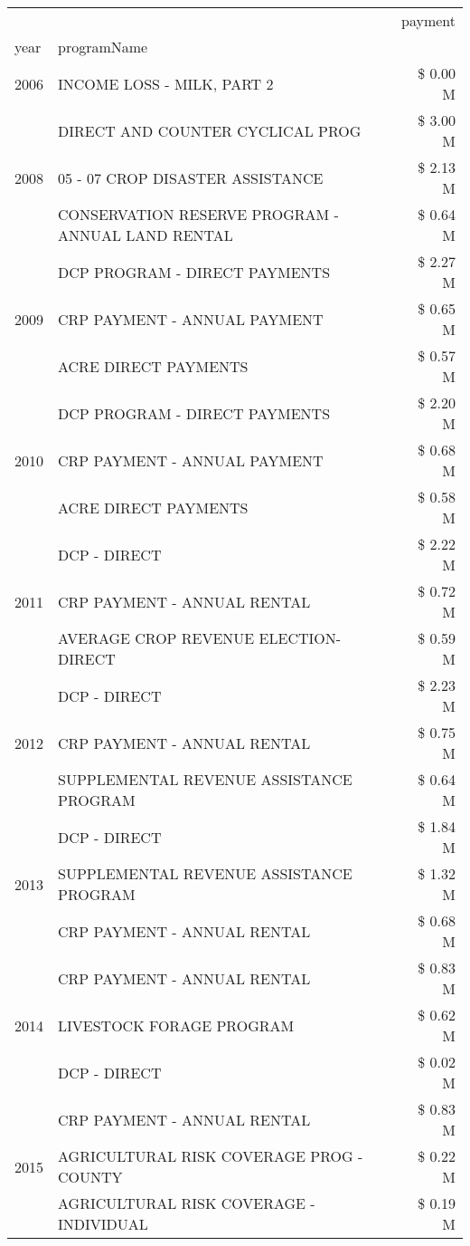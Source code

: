 \begin{tabular}{llr}
\toprule
 &  & payment \\
year & programName &  \\
\midrule
2006 & INCOME LOSS - MILK, PART 2 & \$ 0.00 M \\
\cline{1-3}
\multirow[t]{3}{*}{2008} & DIRECT AND COUNTER CYCLICAL PROG & \$ 3.00 M \\
 & 05 - 07 CROP DISASTER ASSISTANCE & \$ 2.13 M \\
 & CONSERVATION RESERVE PROGRAM - ANNUAL LAND RENTAL & \$ 0.64 M \\
\cline{1-3}
\multirow[t]{3}{*}{2009} & DCP PROGRAM - DIRECT PAYMENTS & \$ 2.27 M \\
 & CRP PAYMENT - ANNUAL PAYMENT & \$ 0.65 M \\
 & ACRE DIRECT PAYMENTS & \$ 0.57 M \\
\cline{1-3}
\multirow[t]{3}{*}{2010} & DCP PROGRAM - DIRECT PAYMENTS & \$ 2.20 M \\
 & CRP PAYMENT - ANNUAL PAYMENT & \$ 0.68 M \\
 & ACRE DIRECT PAYMENTS & \$ 0.58 M \\
\cline{1-3}
\multirow[t]{3}{*}{2011} & DCP - DIRECT & \$ 2.22 M \\
 & CRP PAYMENT - ANNUAL RENTAL & \$ 0.72 M \\
 & AVERAGE CROP REVENUE ELECTION-DIRECT & \$ 0.59 M \\
\cline{1-3}
\multirow[t]{3}{*}{2012} & DCP - DIRECT & \$ 2.23 M \\
 & CRP PAYMENT - ANNUAL RENTAL & \$ 0.75 M \\
 & SUPPLEMENTAL REVENUE ASSISTANCE PROGRAM & \$ 0.64 M \\
\cline{1-3}
\multirow[t]{3}{*}{2013} & DCP - DIRECT & \$ 1.84 M \\
 & SUPPLEMENTAL REVENUE ASSISTANCE PROGRAM & \$ 1.32 M \\
 & CRP PAYMENT - ANNUAL RENTAL & \$ 0.68 M \\
\cline{1-3}
\multirow[t]{3}{*}{2014} & CRP PAYMENT - ANNUAL RENTAL & \$ 0.83 M \\
 & LIVESTOCK FORAGE PROGRAM & \$ 0.62 M \\
 & DCP - DIRECT & \$ 0.02 M \\
\cline{1-3}
\multirow[t]{3}{*}{2015} & CRP PAYMENT - ANNUAL RENTAL & \$ 0.83 M \\
 & AGRICULTURAL RISK COVERAGE PROG - COUNTY & \$ 0.22 M \\
 & AGRICULTURAL RISK COVERAGE - INDIVIDUAL & \$ 0.19 M \\

\end{tabular}

